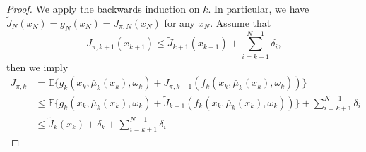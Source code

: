 \begin{proof}
We apply the backwards induction on $k$.
In particular, we have $\tilde{J}_N(x_N)=g_N(x_N)=J_{\pi,N}(x_N)$ for any $x_N$.
Assume that
\[
J_{\pi,k+1}(x_{k+1})\le \tilde{J}_{k+1}(x_{k+1})+\sum_{i=k+1}^{N-1}\delta_i,
\]
then we imply
\begin{align*}
J_{\pi,k}&=\mathbb{E}\Bigg\{
g_k(x_k,\bar{\mu}_k(x_k),\omega_k)
+
J_{\pi,k+1}(f_k(x_k,\bar{\mu}_k(x_k),\omega_k))
\Bigg\}\\
&\le
\mathbb{E}\Bigg\{
g_k(x_k,\bar{\mu}_k(x_k),\omega_k)
+
\tilde{J}_{k+1}(f_k(x_k,\bar{\mu}_k(x_k),\omega_k))
\Bigg\}+\sum_{i=k+1}^{N-1}\delta_i\\
&\le
\tilde{J}_k(x_k)+\delta_k+\sum_{i=k+1}^{N-1}\delta_i
\end{align*}

\end{proof}

